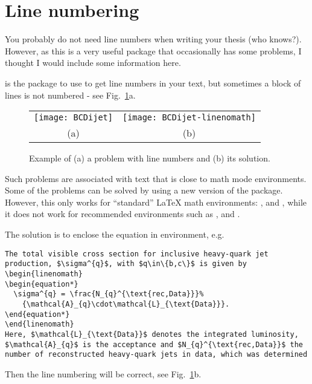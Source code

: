 \section{Line numbering}
\label{sec:tips:lineno}

You probably do not need line numbers when writing your
thesis (who knows?). However, as this is a very useful package that
occasionally has some problems, I thought I would include some
information here.

 is the package to use to get line numbers in your text,
but sometimes a block of lines is not numbered - see Fig.~\ref{fig:lineno}a.

\begin{figure}[htbp]
  \centering
  \begin{tabular}{cc}
  \texttt{[image: BCDijet]} &
  \texttt{[image: BCDijet-linenomath]}\\
  (a) & (b)
  \end{tabular}
  \caption{Example of (a) a problem with line numbers and (b) its solution.}
  \label{fig:lineno}
\end{figure}

Such problems are associated with text that is close to math mode
environments. Some of the problems can be solved by using a new
version of the  package.
However, this only works for \enquote{standard} \LaTeX{}
math environments: ,  and , while it does
not work for recommended  environments such as ,
 and .

The solution is to enclose the equation in  environment, e.g.
\begin{verbatim}
The total visible cross section for inclusive heavy-quark jet
production, $\sigma^{q}$, with $q\in\{b,c\}$ is given by
\begin{linenomath}
\begin{equation*}
  \sigma^{q} = \frac{N_{q}^{\text{rec,Data}}}%
    {\mathcal{A}_{q}\cdot\mathcal{L}_{\text{Data}}}.
\end{equation*}
\end{linenomath}
Here, $\mathcal{L}_{\text{Data}}$ denotes the integrated luminosity,
$\mathcal{A}_{q}$ is the acceptance and $N_{q}^{\text{rec,Data}}$ the
number of reconstructed heavy-quark jets in data, which was determined
\end{verbatim}
\noindent
Then the line numbering will be correct, see Fig.~\ref{fig:lineno}b.


